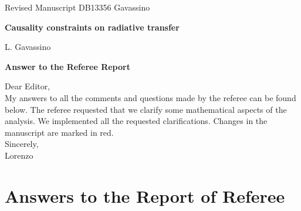 \documentclass[PRD,onecolumn, nofootinbib]{revtex4-1}
\begin{document}
\begin{center}

\Large{Revised Manuscript DB13356 Gavassino}\\

\vspace{0.5cm}

{\bf \Large{Causality constraints on radiative transfer}}\\

\vspace{0.5cm}

\normalsize{L. Gavassino}\\

\vspace{0.5cm}

{\bf \large{Answer to the Referee Report}}\\

\end{center}

\vspace{0.5cm}

\noindent
Dear Editor,\\

\noindent 
My answers to all the comments and questions made by the referee can be found below. The referee requested that we clarify some mathematical aspects of the analysis. We implemented all the requested clarifications. Changes in the manuscript are marked in red. \\



\noindent
Sincerely,\\

\noindent
Lorenzo








\newpage







\newpage 

\section*{Answers to the Report of Referee}
\end{document}
